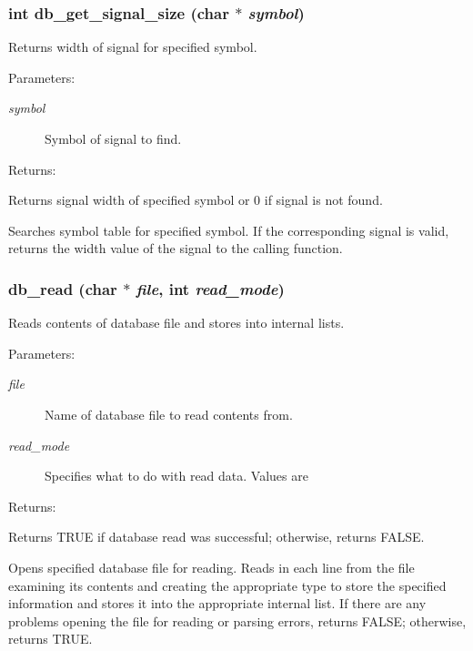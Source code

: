 \subsubsection{\setlength{\rightskip}{0pt plus 5cm}int db\_\-get\_\-signal\_\-size (char $\ast$ {\em symbol})}\label{db_8h_a12}


Returns width of signal for specified symbol.

\begin{Desc}
\item[Parameters: ]\par
\begin{description}
\item[{\em 
symbol}]Symbol of signal to find.\end{description}
\end{Desc}
\begin{Desc}
\item[Returns: ]\par
Returns signal width of specified symbol or 0 if signal is not found.\end{Desc}
Searches symbol table for specified symbol. If the corresponding signal is valid, returns the width value of the signal to the calling function. 
\subsubsection{ db\_\-read (char $\ast$ {\em file}, int {\em read\_\-mode})}\label{db_8h_a1}


Reads contents of database file and stores into internal lists.

\begin{Desc}
\item[Parameters: ]\par
\begin{description}
\item[{\em 
file}]Name of database file to read contents from. \item[{\em 
read\_\-mode}]Specifies what to do with read data. Values are
\end{description}
\end{Desc}
\begin{Desc}
\item[Returns: ]\par
Returns TRUE if database read was successful; otherwise, returns FALSE.\end{Desc}
Opens specified database file for reading. Reads in each line from the file examining its contents and creating the appropriate type to store the specified information and stores it into the appropriate internal list. If there are any problems opening the file for reading or parsing errors, returns FALSE; otherwise, returns TRUE. 
